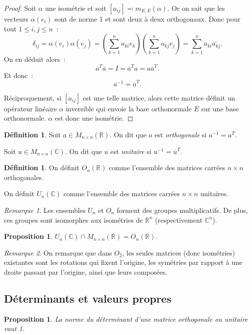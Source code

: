 \documentclass{article}
\newcommand{\R}{\mathbb R}
\newcommand{\C}{\mathbb C}
\newcommand{\M}[3]{M_{#1 \times #2}(#3)}
\newcommand{\conj}[1]{\overline {#1}}
\newtheorem{prp}[thm]{Proposition}
\theoremstyle{definition}
\newtheorem{déf}[thm]{Définition}
\theoremstyle{remark}
\newtheorem*{rmq}{Remarque}
\begin{document}
		\begin{proof} Soit $\alpha$ une isométrie et soit $[a_{ij}] \eqqcolon m_{E, E}(\alpha)$. Or on sait que les vecteurs $\alpha(e_i)$ sont de norme 1 et
		sont deux à deux orthogonaux. Donc pour tout $1 \leq i, j \leq n$~:
		\[\delta_{ij} = \alpha(e_i)\alpha(e_j) = \left(\sum_{k=1}^na_{ki}e_k\right)\left(\sum_{k=1}^na_{kj}e_j\right) = \sum_{k=1}^na_{ki}\conj {a_{kj}}.\]
		On en déduit alors~:
		\[a^T\conj a = I = \conj a^Ta = a\conj a^T.\]
		Et donc~:
		\[a^{-1} = \conj a^T.\]

		Réciproquement, si $[a_{ij}]$ est une telle matrice, alors cette matrice définit un opérateur linéaire $\alpha$ inversible qui envoie la base
		orthonormale $E$ sur une base orthonormale. $\alpha$ est donc une isométrie.
		\end{proof}

		\begin{déf} Soit $a \in \M nn\R$. On dit que $a$ est \emph{orthogonale} si $a^{-1} = a^T$.

		Soit $u \in \M nn\C$. On dit que $u$ est \emph{unitaire} si $u^{-1} = \conj u^T$.
		\end{déf}

		\begin{déf} On définit $O_n(\R)$ comme l'ensemble des matrices carrées $n \times n$ orthogonales.

		On définit $U_n(\C)$ comme l'ensemble des matrices carrées $n \times n$ unitaires.
		\end{déf}

		\begin{rmq} Les ensembles $U_n$ et $O_n$ forment des groupes multiplicatifs. De plus, ces groupes sont isomorphes aux isométries de $\R^n$
		(respectivement $\C^n$).
		\end{rmq}

		\begin{prp} $U_n(\C) \cap \M nn\R = O_n(\R)$.
		\end{prp}

		\begin{rmq} On remarque que dans $O_2$, les seules matrices (donc isométries) existantes sont les rotations qui fixent l'origine, les symétries par
		rapport à une droite passant par l'origine, ainsi que leurs composées.
		\end{rmq}

		\subsection{Déterminants et valeurs propres}
		\begin{prp} La norme du déterminant d'une matrice orthogonale ou unitaire vaut 1.
		\end{prp}
\end{document}
